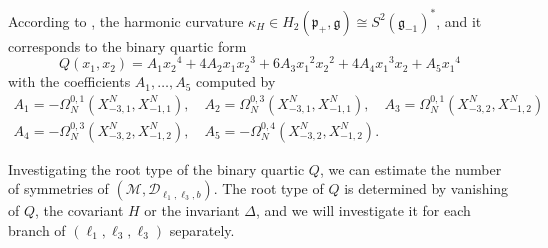 \documentclass{amsart}
\theoremstyle{plain}
\theoremstyle{definition}
\theoremstyle{remark}
\newcommand{\mc}[1]{\mathcal{#1}}
\newcommand{\mfk}[1]{\mathfrak{#1}}
\begin{document}
According to \cite[pp. 6, 25-26]{dt2022}, the harmonic curvature $\kappa_H \in H_2(\mfk{p}_+,\mfk{g}) \cong S^2(\mfk{g}_{-1})^*$, and it corresponds to the binary quartic form
\begin{equation} \label{cartan_biquartic}
    Q(x_1,x_2) = A_1 {x_2}^4 + 4A_2 x_1 {x_2}^3 + 6 A_3 {x_1}^2 {x_2}^2 + 4 A_4 {x_1}^3 x_2 + A_5 {x_1}^4
\end{equation}
with the coefficients $A_1, \dots, A_5$ computed by
\begin{equation*}
\begin{gathered}
    A_1 = -\Omega_N^{0,1} (X^N_{-3,1}, X^N_{-1,1}),\quad A_2 = \Omega_N^{0,3} (X^N_{-3,1}, X^N_{-1,1}),\quad A_3 = \Omega_N^{0,1} (X^N_{-3,2}, X^N_{-1,2})\\
    A_4 = -\Omega_N^{0,3} (X^N_{-3,2}, X^N_{-1,2}),\quad A_5 = -\Omega_N^{0,4} (X^N_{-3,2}, X^N_{-1,2}).
\end{gathered}
\end{equation*}

Investigating the root type of the binary quartic $Q$, we can estimate the number of symmetries of $(\mc{M},\mc{D}_{\ell_1,\ell_3,b})$. The root type of $Q$ is determined by vanishing of $Q$, the covariant $H$ or the invariant $\Delta$, and we will investigate it for each branch of $(\ell_1,\ell_3,\ell_3)$ separately.
\end{document}
